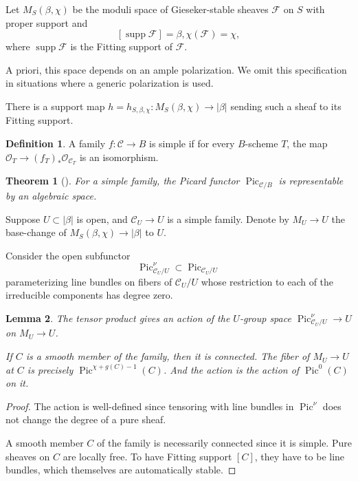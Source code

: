 \documentclass{amsart}
\theoremstyle{plain}
\newtheorem{theorem}{Theorem}[section]
\newtheorem{lemma}[theorem]{Lemma}
\theoremstyle{definition}
\newtheorem{definition}{Definition}[section]
\theoremstyle{remark}
\begin{document}
Let $M_S(\beta,\chi)$ be the moduli space of Gieseker-stable sheaves $\mathcal F$ on $S$ with proper support and
\[[\operatorname{supp}\mathcal F]=\beta,\chi(\mathcal F)=\chi,\]
where $\operatorname{supp}\mathcal F$ is the Fitting support of $\mathcal F$.

A priori, this space depends on an ample polarization.
We omit this specification in situations where a generic polarization is used.

There is a support map $h=h_{S,\beta,\chi}:M_S(\beta,\chi)\to |\beta|$ sending such a sheaf to its Fitting support.
\begin{definition}
    A family $f:\mathcal C\to B$ is simple if for every $B$-scheme $T$, the map $\mathcal O_T\to (f_T)_\ast\mathcal O_{\mathcal C_T}$ is an isomorphism.
\end{definition}
\begin{theorem}[{\cite[\href{https://stacks.math.columbia.edu/tag/0D2C}{Tag 0D2C}]{stacks-project}}]
    For a simple family, the Picard functor $\operatorname{Pic}_{\mathcal C/B}$ is representable by an algebraic space.
\end{theorem}
Suppose $U\subset |\beta|$ is open, and $\mathcal C_U\to U$ is a simple family.
Denote by $M_U\to U$ the base-change of $M_S(\beta,\chi)\to|\beta|$ to $U$.

Consider the open subfunctor
\[\operatorname{Pic}_{\mathcal C_U/U}^\nu\subset\operatorname{Pic}_{\mathcal C_U/U}\]
parameterizing line bundles on fibers of $\mathcal C_U/U$ whose restriction to each of the irreducible components has degree zero.
\begin{lemma}\label{lem:picnuaction}
    The tensor product gives an action of the $U$-group space $\operatorname{Pic}^\nu_{\mathcal C_U/U}\to U$ on $M_U\to U$.

    If $C$ is a smooth member of the family, then it is connected.
    The fiber of $M_U\to U$ at $C$ is precisely $\operatorname{Pic}^{\chi+g(C)-1}(C)$.
    And the action is the action of $\operatorname{Pic}^0(C)$ on it.
\end{lemma}
\begin{proof}
    The action is well-defined since tensoring with line bundles in $\operatorname{Pic}^\nu$ does not change the degree of a pure sheaf.

    A smooth member $C$ of the family is necessarily connected since it is simple.
    Pure sheaves on $C$ are locally free.
    To have Fitting support $[C]$, they have to be line bundles, which themselves are automatically stable.
\end{proof}
\end{document}
